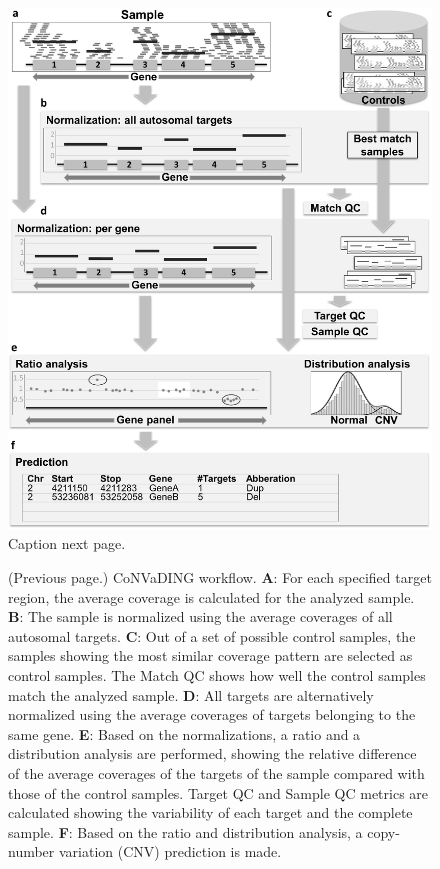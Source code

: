 \begin{figure}
	\includegraphics[width=1.0\linewidth]{img/CoNVaDING_Fig1}
	\caption[CoNVaDING workflow]{Caption next page.}
	\label{fig:CoNVaDING_Fig1}
\end{figure}
\addtocounter{figure}{-1}
\begin{figure}
\caption[]{(Previous page.) CoNVaDING workflow. \textbf{A}: For each specified target region, the average coverage is calculated for the analyzed sample. \textbf{B}: The sample is normalized using the average coverages of all autosomal targets. \textbf{C}: Out of a set of possible control samples, the samples showing the most similar coverage pattern are selected as control samples. The Match QC shows how well the control samples match the analyzed sample. \textbf{D}: All targets are alternatively normalized using the average coverages of targets belonging to the same gene. \textbf{E}: Based on the normalizations, a ratio and a distribution analysis are performed, showing the relative difference of the average coverages of the targets of the sample compared with those of the control samples. Target QC and Sample QC metrics are calculated showing the variability of each target and the complete sample. \textbf{F}: Based on the ratio and distribution analysis, a copy-number variation (CNV) prediction is made.}
\end{figure}

